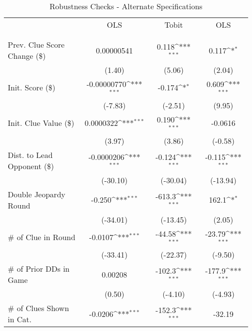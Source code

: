 \begin{table}[htbp]\centering
\def\sym#1{\ifmmode^{#1}\else\(^{#1}\)\fi}
\caption{Robustness Checks - Alternate Specifications}
\begin{tabular}{l*{3}{c}}
\hline\hline
            &         OLS         &       Tobit         &         OLS         \\
            &&&\\
\hline
            &                     &                     &                     \\
Prev. Clue Score Change (\$)&  0.00000541         &       0.118\sym{***}&       0.117\sym{*}  \\
            &      (1.40)         &      (5.06)         &      (2.04)         \\
Init. Score (\$)& -0.00000770\sym{***}&      -0.174\sym{*}  &       0.609\sym{***}\\
            &     (-7.83)         &     (-2.51)         &      (9.95)         \\
Init. Clue Value (\$)&   0.0000322\sym{***}&       0.190\sym{***}&     -0.0616         \\
            &      (3.97)         &      (3.86)         &     (-0.58)         \\
Dist. to Lead Opponent (\$)&  -0.0000206\sym{***}&      -0.124\sym{***}&      -0.115\sym{***}\\
            &    (-30.10)         &    (-30.04)         &    (-13.94)         \\
Double Jeopardy Round&      -0.250\sym{***}&      -613.3\sym{***}&       162.1\sym{*}  \\
            &    (-34.01)         &    (-13.45)         &      (2.05)         \\
\# of Clue in Round&     -0.0107\sym{***}&      -44.58\sym{***}&      -23.79\sym{***}\\
            &    (-33.41)         &    (-22.37)         &     (-9.50)         \\
\# of Prior DDs in Game&     0.00208         &      -102.3\sym{***}&      -177.9\sym{***}\\
            &      (0.50)         &     (-4.10)         &     (-4.93)         \\
\# of Clues Shown in Cat.&     -0.0206\sym{***}&      -152.3\sym{***}&      -32.19         \\

\end{tabular}
\end{table}
